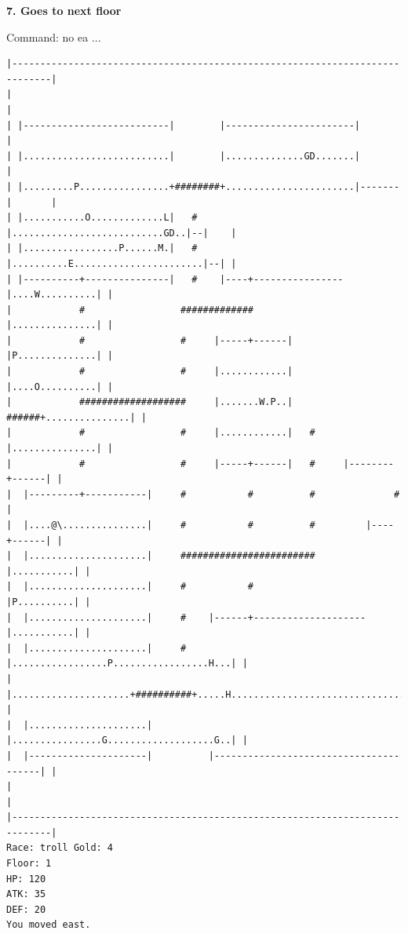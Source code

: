 \documentclass[11pt]{article}
\theoremstyle{plain}
\begin{document}
\newpage
\textbf{7. Goes to next floor}

Command: no ea ...

\begin{Verbatim}[fontsize=\scriptsize]
|-----------------------------------------------------------------------------|
|                                                                             |
| |--------------------------|        |-----------------------|               |
| |..........................|        |..............GD.......|               |
| |.........P................+########+.......................|-------|       |
| |...........O.............L|   #    |...........................GD..|--|    |
| |.................P......M.|   #    |..........E.......................|--| |
| |----------+---------------|   #    |----+----------------|....W..........| |
|            #                 #############                |...............| |
|            #                 #     |-----+------|         |P..............| |
|            #                 #     |............|         |....O..........| |
|            ###################     |.......W.P..|   ######+...............| |
|            #                 #     |............|   #     |...............| |
|            #                 #     |-----+------|   #     |--------+------| |
|  |---------+-----------|     #           #          #              #        |
|  |....@\...............|     #           #          #         |----+------| |
|  |.....................|     ########################         |...........| |
|  |.....................|     #           #                    |P..........| |
|  |.....................|     #    |------+--------------------|...........| |
|  |.....................|     #    |.................P.................H...| |
|  |.....................+##########+.....H.................................| |
|  |.....................|          |................G...................G..| |
|  |---------------------|          |---------------------------------------| |
|                                                                             |
|-----------------------------------------------------------------------------|
Race: troll Gold: 4                                                    Floor: 1
HP: 120
ATK: 35
DEF: 20
You moved east. 
\end{Verbatim}
\end{document}
